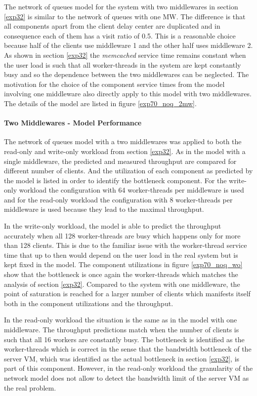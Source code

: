 \documentclass[report.tex]{subfiles}
\begin{document}
The network of queues model for the system with two middlewares in section \ref{exp32} is similar to the network of queues with one MW.
The difference is that all components apart from the client delay center are duplicated and in consequence each of them has a visit ratio of 0.5.
This is a reasonable choice because half of the clients use middleware 1 and the other half uses middleware 2. As shown in section \ref{exp32} the \emph{memcached} service time remains constant when the user load is such that all worker-threads in the system are kept constantly busy and so the dependence between the two middlewares can be neglected. The motivation for the choice of the component service times from the model involving one middleware also directly apply to this model with two middlewares.
The details of the model are listed in figure \ref{exp70_noq_2mw}.

\paragraph{Two Middlewares - Model Performance}
The network of queues model with a two middlewares was applied to both the read-only and write-only workload from section \ref{exp32}.
As in the model with a single middleware, the predicted and measured throughput are compared for different number of clients.
And the utilization of each component as predicted by the model is listed in order to identify the bottleneck component. For the write-only workload the configuration with 64 worker-threads per middleware is used and for the read-only workload the configuration with 8 worker-threads per middleware is used because they lead to the maximal throughput.

In the write-only workload, the model is able to predict the throughput accurately when all 128 worker-threads are busy which happens only for more than 128 clients. This is due to the familiar issue with the worker-thread service time that up to then would depend on the user load in the real system but is kept fixed in the model.
The component utilizations in figure \ref{exp70_noq_wo} show that the bottleneck is once again the worker-threads which matches the analysis of section \ref{exp32}.  Compared to the system with one middleware, the point of saturation is reached for a larger number of clients which manifests itself both in the component utilizations and the throughput.

In the read-only workload the situation is the same as in the model with one middleware. The throughput predictions match when the number of clients is such that all 16 workers are constantly busy. The bottleneck is identified as the worker-threads which is correct in the sense that the bandwidth bottleneck of the server VM, which was identified as the actual bottleneck in section \ref{exp32}, is part of this component.
However, in the read-only workload the granularity of the network model does not allow to detect the bandwidth limit of the server VM as the real problem. 
\end{document}

